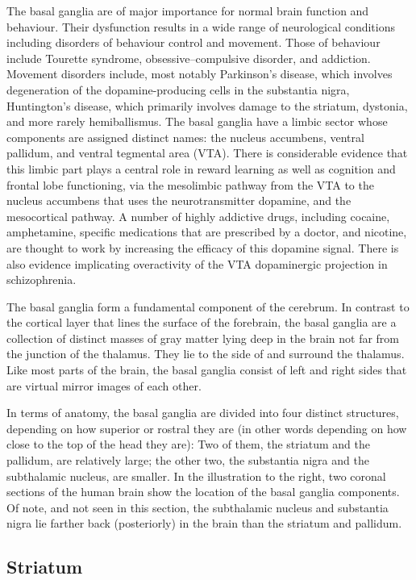 \documentclass[]{book}
\begin{document}
The basal ganglia are of major importance for normal brain function and behaviour. Their dysfunction results in a wide range of neurological conditions including disorders of behaviour control and movement. Those of behaviour include Tourette syndrome, obsessive--compulsive disorder, and addiction. Movement disorders include, most notably Parkinson's disease, which involves degeneration of the dopamine-producing cells in the substantia nigra, Huntington's disease, which primarily involves damage to the striatum, dystonia, and more rarely hemiballismus. The basal ganglia have a limbic sector whose components are assigned distinct names: the nucleus accumbens, ventral pallidum, and ventral tegmental area (VTA). There is considerable evidence that this limbic part plays a central role in reward learning as well as cognition and frontal lobe functioning, via the mesolimbic pathway from the VTA to the nucleus accumbens that uses the neurotransmitter dopamine, and the mesocortical pathway. A number of highly addictive drugs, including cocaine, amphetamine, specific medications that are prescribed by a doctor, and nicotine, are thought to work by increasing the efficacy of this dopamine signal. There is also evidence implicating overactivity of the VTA dopaminergic projection in schizophrenia.

The basal ganglia form a fundamental component of the cerebrum. In contrast to the cortical layer that lines the surface of the forebrain, the basal ganglia are a collection of distinct masses of gray matter lying deep in the brain not far from the junction of the thalamus. They lie to the side of and surround the thalamus. Like most parts of the brain, the basal ganglia consist of left and right sides that are virtual mirror images of each other.

In terms of anatomy, the basal ganglia are divided into four distinct structures, depending on how superior or rostral they are (in other words depending on how close to the top of the head they are): Two of them, the striatum and the pallidum, are relatively large; the other two, the substantia nigra and the subthalamic nucleus, are smaller. In the illustration to the right, two coronal sections of the human brain show the location of the basal ganglia components. Of note, and not seen in this section, the subthalamic nucleus and substantia nigra lie farther back (posteriorly) in the brain than the striatum and pallidum.

\hypertarget{striatum}{%
\subsection{Striatum}\label{striatum}}
\end{document}
